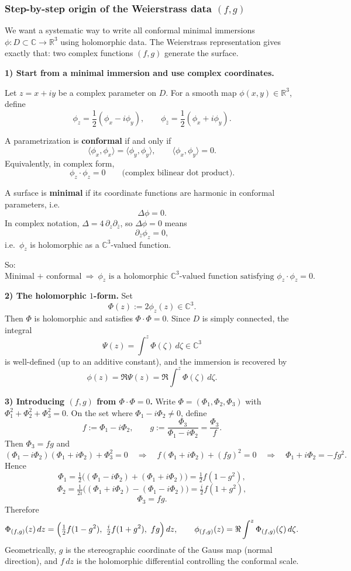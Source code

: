 \documentclass[12pt,a4paper]{article}
\theoremstyle{plain}
\theoremstyle{definition}      %
\begin{document}
\medskip

\subsubsection*{Step-by-step origin of the Weierstrass data $(f,g)$}

We want a systematic way to write all conformal minimal immersions
$\phi : D \subset \mathbb{C} \to \mathbb{R}^3$ using holomorphic data.
The Weierstrass representation gives exactly that: two complex functions $(f,g)$ generate the surface.

\medskip
\textbf{1) Start from a minimal immersion and use complex coordinates.}

Let $z = x + iy$ be a complex parameter on $D$. For a smooth map $\phi(x,y) \in \mathbb{R}^3$, define
\[
\phi_z = \frac{1}{2}(\phi_x - i\phi_y),
\qquad
\phi_{\bar z} = \frac{1}{2}(\phi_x + i\phi_y).
\]

A parametrization is \textbf{conformal} if and only if
\[
\langle \phi_x,\phi_x\rangle = \langle \phi_y,\phi_y\rangle,
\qquad
\langle \phi_x,\phi_y\rangle = 0.
\]
Equivalently, in complex form,
\[
\phi_z \cdot \phi_z = 0
\qquad
\text{(complex bilinear dot product).}
\]

A surface is \textbf{minimal} if its coordinate functions are harmonic in conformal parameters, i.e.
\[
\Delta \phi = 0.
\]
In complex notation, $\Delta = 4\,\partial_z \partial_{\bar z}$, so $\Delta \phi = 0$ means
\[
\partial_{\bar z}\phi_z = 0,
\]
i.e.\ $\phi_z$ is holomorphic as a $\mathbb{C}^3$-valued function.

\medskip
So:
\[
\boxed{\text{Minimal + conformal} \ \Longrightarrow\  \phi_z \text{ is a holomorphic } \mathbb{C}^3\text{-valued function satisfying } \phi_z\cdot\phi_z = 0.}
\]

\smallskip
\textbf{2) The holomorphic $1$-form.}
Set
\[
\Phi(z):=2\phi_z(z)\in\mathbb C^3.
\]
Then $\Phi$ is holomorphic and satisfies $\Phi\cdot\Phi=0$.
Since $D$ is simply connected, the integral
\[
\Psi(z)=\int^z \Phi(\zeta)\,d\zeta\in\mathbb C^3
\]
is well-defined (up to an additive constant), and the immersion is recovered by
\[
\phi(z)=\Re\Psi(z)=\Re\int^z \Phi(\zeta)\,d\zeta.
\]

\smallskip
\textbf{3) Introducing $(f,g)$ from $\Phi\cdot\Phi=0$.}
Write $\Phi=(\Phi_1,\Phi_2,\Phi_3)$ with $\Phi_1^2+\Phi_2^2+\Phi_3^2=0$.
On the set where $\Phi_1-i\Phi_2\neq 0$, define
\[
f:=\Phi_1-i\Phi_2,\qquad g:=\frac{\Phi_3}{\Phi_1-i\Phi_2}=\frac{\Phi_3}{f}.
\]
Then $\Phi_3=fg$ and
\[
(\Phi_1-i\Phi_2)(\Phi_1+i\Phi_2)+\Phi_3^2=0
\quad\Longrightarrow\quad
f(\Phi_1+i\Phi_2)+(fg)^2=0
\quad\Longrightarrow\quad
\Phi_1+i\Phi_2=-fg^2.
\]
Hence
\[
\Phi_1=\tfrac12\bigl((\Phi_1-i\Phi_2)+(\Phi_1+i\Phi_2)\bigr)=\tfrac12 f(1-g^2),
\]
\[
\Phi_2=\tfrac{1}{2i}\bigl((\Phi_1+i\Phi_2)-(\Phi_1-i\Phi_2)\bigr)=\tfrac{i}{2} f(1+g^2),
\]
\[
\Phi_3=fg.
\]
Therefore
\[
\Phi_{(f,g)}(z)\,dz
=
\Bigl(\tfrac12 f(1-g^2),\ \tfrac{i}{2}f(1+g^2),\ fg\Bigr)\,dz,
\qquad
\phi_{(f,g)}(z)=\Re\int^z \Phi_{(f,g)}(\zeta)\,d\zeta.
\]
Geometrically, $g$ is the stereographic coordinate of the Gauss map (normal direction), and $f\,dz$
is the holomorphic differential controlling the conformal scale.
\end{document}
